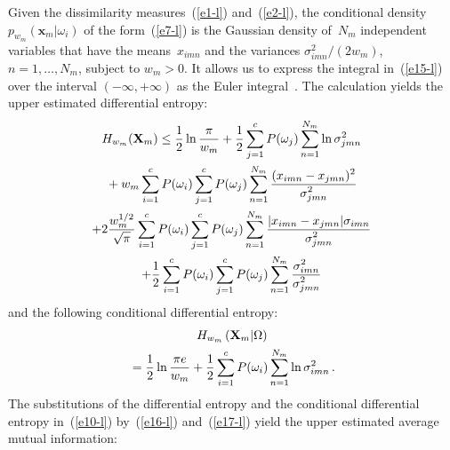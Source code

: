 \begin{multicols}{2}
Given the dissimilarity measures~(\ref{e1-l}) and~(\ref{e2-l}), the conditional 
density $p_{w_m}(\mathbf{x}_m\vert\omega_i)$ of the form~(\ref{e7-l}) is the 
Gaussian density of~$N_m$ independent variables that have the 
means~$x_{imn}$ and the variances $\sigma^2_{imn}/(2w_m)$, $n=1,\ldots , 
N_m$, subject to $w_m>0$. It allows us to express the integral in~(\ref{e15-l}) 
over the interval $(-\infty, +\infty)$  as the Euler integral~\cite{12-l}. The 
calculation yields the upper estimated differential entropy:
\begin{multline}
H_{w_m}(\mathbf{X}_m)\leq \displaystyle\frac{\displaystyle 1\mathstrut}{\displaystyle 2\mathstrut}\ln 
\displaystyle\frac{\displaystyle \pi\mathstrut}{\displaystyle w_m\mathstrut}+\displaystyle\frac{\displaystyle 1\mathstrut}{\displaystyle 2\mathstrut}\sum\limits^c_{j=1} P(\omega_j)  
\sum\limits_{n=1}^{N_m} \ln \sigma^2_{jmn}\\
{}+w_m \sum\limits^c_{i=1} P(\omega_i) \sum\limits^c_{j=1} P(\omega_j) 
\sum\limits_{n=1}^{N_m} \displaystyle\frac{\displaystyle (x_{imn}-x_{jmn})^2\mathstrut}{\displaystyle \sigma^2_{jmn}\mathstrut}\\
+2\displaystyle\frac{\displaystyle w_m^{1/2}\mathstrut}{\displaystyle \sqrt{\pi}\mathstrut}\sum\limits^c_{i=1} 
P(\omega_i)\sum\limits^c_{j=1} P(\omega_j) \sum\limits_{n=1}^{N_m} 
\displaystyle\frac{\displaystyle \vert x_{imn}-x_{jmn}\vert \sigma_{imn}\mathstrut}{\displaystyle \sigma^2_{jmn}\mathstrut}\\
+\displaystyle\frac{\displaystyle 1\mathstrut}{\displaystyle 2\mathstrut}\sum\limits^c_{i=1} P(\omega_i) \sum\limits^c_{j=1} P(\omega_j) 
\sum\limits_{n=1}^{N_m} \displaystyle\frac{\displaystyle \sigma^2_{imn}\mathstrut}{\displaystyle \sigma^2_{jmn}\mathstrut}
\label{e16-l}
\end{multline}
and the following conditional differential entropy:
\begin{multline}
H_{w_m}\left(\mathbf{X}_m\vert\Omega\right) \\
{}=\displaystyle\frac{\displaystyle 1\mathstrut}{\displaystyle 2\mathstrut}\ln \displaystyle\frac{\displaystyle \pi e\mathstrut}{\displaystyle w_m\mathstrut} 
+\displaystyle\frac{\displaystyle 1\mathstrut}{\displaystyle 2\mathstrut} \sum\limits^c_{i=1} P(\omega_i) \sum\limits_{n=1}^{N_m} \ln 
\sigma^2_{imn}\,.
\label{e17-l}
\end{multline}
The substitutions of the differential entropy and the conditional differential entropy 
in~(\ref{e10-l}) by~(\ref{e16-l}) and~(\ref{e17-l}) yield the upper 
estimated average mutual information:


\end{multicols}

